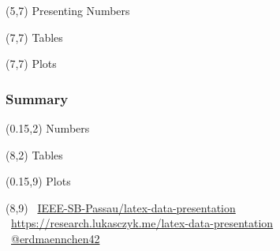 \documentclass[t]{beamer}
\begin{document}
\begin{frame}
  \begin{textblock}{10}(5,7)
    \LARGE Presenting Numbers
  \end{textblock}
\end{frame}

\begin{frame}
  \begin{textblock}{10}(7,7)
    \LARGE Tables
  \end{textblock}
\end{frame}

\begin{frame}
  \begin{textblock}{10}(7,7)
    \LARGE Plots
  \end{textblock}
\end{frame}

\begin{frame}
  \frametitle{Summary}
  \begin{textblock}{0}(0.15,2)
    Numbers 
  \end{textblock}
  \begin{textblock}{0}(8,2)
    Tables 
  \end{textblock}

  \begin{textblock}{0}(0.15,9)
    Plots
  \end{textblock}
  \begin{textblock}{6}(8,9)
    \faGithub~\href{https://github.com/IEEE-SB-Passau/latex-data-presentation}%
      {IEEE-SB-Passau/latex-data-presentation}\\
    \faCode~\href{https://research.lukasczyk.me/latex-data-presentation}%
      {https://research.lukasczyk.me/latex-data-presentation}\\
    \faTwitter~\href{https://twitter.com/erdmaennchen42}{@erdmaennchen42}
  \end{textblock}
\end{frame}
\end{document}
